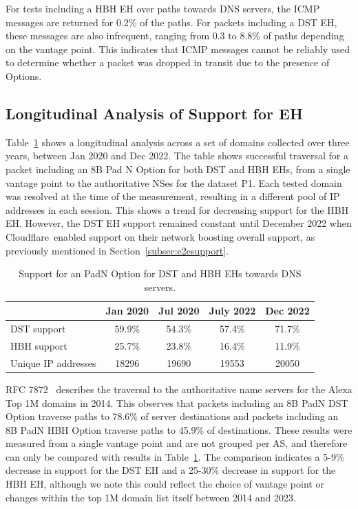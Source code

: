 \documentclass[conference]{IEEEtran}
\begin{document}
For tests including a
HBH EH over paths towards DNS servers, the ICMP messages
are returned for 0.2\% of the paths. For packets including a DST EH, these messages
are also infrequent, ranging from 0.3 to 8.8\% of paths depending on the
vantage point. 
This indicates that ICMP messages cannot be reliably used to
determine whether a packet was dropped in transit due to the presence of Options.



\subsection{Longitudinal Analysis of Support for EH}

Table~\ref{tbl:longitudinal_support} shows a longitudinal analysis
across a set of domains collected over three years,  between Jan 2020 and
Dec 2022.  The table shows successful traversal for a packet including an 8B Pad N Option for both DST and
HBH EHs, from a single vantage point to the authoritative NSes for the dataset P1.
Each tested domain was resolved at the time of the measurement, resulting in a
different pool of IP addresses in each session. 
This shows a trend for decreasing support for the HBH EH. However, the DST EH support
remained constant until December 2022 when Cloudflare\texttrademark\ enabled support on
their network boosting  overall support, as previously
mentioned in Section~\ref{subsec:e2esupport}.

\begin{table}
\caption{Support for an PadN Option for DST and HBH EHs towards DNS servers.}
\begin{tabular}{l|c|c|c|c}
              & Jan 2020 & Jul 2020 & July 2022 & Dec 2022 \\
\hline \hline
DST support   & 59.9\%   & 54.3\%   & 57.4\%    & 71.7\%   \\
HBH support   & 25.7\%   & 23.8\%   & 16.4\%    & 11.9\%   \\
\hline
Unique IP addresses & 18296    & 19690    & 19553     & 20050   
\end{tabular}
\label{tbl:longitudinal_support}
\end{table}


RFC 7872~\cite{RFC7872} describes the traversal to the authoritative name servers for the Alexa Top 1M domains in 2014. This observes that packets including an 8B PadN DST Option traverse paths to 78.6\% of server destinations and packets including an 8B PadN HBH Option traverse paths to 45.9\% of destinations. These results were measured from a single vantage point and are not grouped per AS, and therefore can only be compared with results in Table~\ref{tbl:longitudinal_support}. The comparison indicates a 5-9\% decrease in support for the DST EH and a 25-30\% decrease in support for the HBH EH, although we note this could reflect the choice of vantage point or changes within the top 1M domain list itself between 2014 and 2023.
\end{document}
